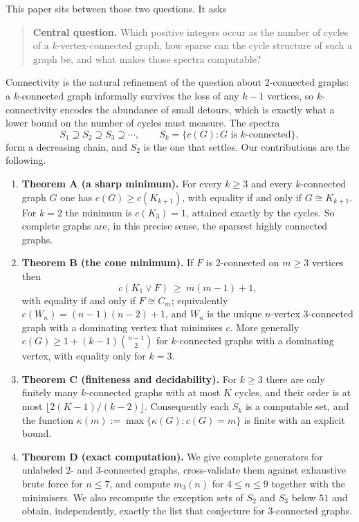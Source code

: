 \documentclass[11pt,a4paper]{article}
\theoremstyle{definition}
\newcommand{\KZ}{K_{k+1}}
\newcommand{\Wi}{W_n}
\newcommand{\cKn}[1]{c(K_{#1})}
\begin{document}
This paper sits between those two questions.  It asks

\begin{quote}\textbf{Central question.} Which positive integers occur as the
number of cycles of a $k$-vertex-connected graph, how sparse can the cycle
structure of such a graph be, and what makes those spectra computable?
\end{quote}

Connectivity is the natural refinement of the question about $2$-connected
graphs: a $k$-connected graph informally survives the loss of any $k-1$
vertices, so $k$-connectivity encodes the abundance of small detours, which is
exactly what a lower bound on the number of cycles must measure.  The spectra
\[
 S_1 \supseteq S_2 \supseteq S_3 \supseteq \cdots,
\qquad
 S_k = \{c(G) : G \text{ is } k\text{-connected}\},
\]
form a decreasing chain, and $S_2$ is the one that \cite{mcculloch2026}
settles.  Our contributions are the following.

\begin{enumerate}[leftmargin=*,label=(\roman*)]
\item \textbf{Theorem A (a sharp minimum).}  For every $k\ge 3$ and every
  $k$-connected graph $G$ one has $c(G)\ge \cKn{k+1}$, with equality if and only
  if $G\cong\KZ$.  For $k=2$ the minimum is $\cKn{3}=1$, attained exactly by
  the cycles.  So complete graphs are, in this precise sense, the sparsest
  highly connected graphs.
\item \textbf{Theorem B (the cone minimum).}  If $F$ is $2$-connected on
  $m\ge 3$ vertices then
  \[
     c(K_1\vee F)\ \ge\ m(m-1)+1,
  \]
  with equality if and only if $F\cong C_m$; equivalently
  $c(\Wi)=(n-1)(n-2)+1$, and $\Wi$ is the unique $n$-vertex $3$-connected
  graph with a dominating vertex that minimises $c$.  More generally
  $c(G)\ge 1+(k-1)\binom{n-1}{2}$ for $k$-connected graphs with a dominating
  vertex, with equality only for $k=3$.
\item \textbf{Theorem C (finiteness and decidability).}  For $k\ge 3$ there
  are only finitely many $k$-connected graphs with at most $K$ cycles, and their
  order is at most $\lfloor 2(K-1)/(k-2)\rfloor$.  Consequently each $S_k$ is a
  computable set, and the function $\kappa(m):=\max\{\kappa(G): c(G)=m\}$ is
  finite with an explicit bound.
\item \textbf{Theorem D (exact computation).}  We give complete generators for
  unlabeled $2$- and $3$-connected graphs, cross-validate them against
  exhaustive brute force for $n\le 7$, and compute $m_3(n)$ for $4\le n\le 9$
  together with the minimisers.  We also recompute the exception sets of $S_2$
  and $S_3$ below $51$ and obtain, independently, exactly the list that
  \cite{mcculloch2026} conjecture for $3$-connected graphs.
\end{enumerate}
\end{document}
